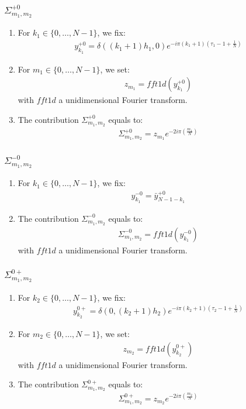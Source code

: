 \subsubsection{$\Sigma_{m_1,m_2}^{+0}$}
\begin{enumerate}
\item For $k_1\in\{0,\hdots,N-1\}$, we fix:
\begin{align*}
y^{+0}_{k_1}= \delta((k_1+1)h_1,0)e^{-i\pi (k_1+1)\left(\tau_1-1+\frac{1}{N}\right)}
\end{align*}
\item For $m_1\in\{0,\hdots,N-1\}$, we set:
\begin{align*}
  z_{m_1}=fft1d(y^{+0}_{k_1})
\end{align*}
with $fft1d$ a unidimensional Fourier transform.
\item The contribution $\Sigma_{m_1,m_2}^{+0}$ equals to:
\begin{align*}
  \Sigma_{m_1,m_2}^{+0}=z_{m_1} e^{-2i\pi\left(\frac{m_1}{N}\right)}
\end{align*}
\end{enumerate}

\subsubsection{$\Sigma_{m_1,m_2}^{-0}$}
\begin{enumerate}
\item For $k_1\in\{0,\hdots,N-1\}$, we fix:
\begin{align*}
y^{-0}_{k_1}= \bar{y}^{+0}_{N-1-k_1}
\end{align*}
\item The contribution $\Sigma_{m_1,m_2}^{-0}$ equals to:
\begin{align*}
  \Sigma_{m_1,m_2}^{-0}=fft1d(y^{-0}_{k_1})
\end{align*}
with $fft1d$ a unidimensional Fourier transform.
\end{enumerate}

\subsubsection{$\Sigma_{m_1,m_2}^{0+}$}
\begin{enumerate}
\item For $k_2\in\{0,\hdots,N-1\}$, we fix:
\begin{align*}
y^{0+}_{k_2}= \delta(0,(k_2+1)h_2)e^{-i\pi (k_2+1)\left(\tau_2-1+\frac{1}{N}\right)}
\end{align*}
\item For $m_2\in\{0,\hdots,N-1\}$, we set:
\begin{align*}
  z_{m_2}=fft1d(y^{0+}_{k_2})
\end{align*}
with $fft1d$ a unidimensional Fourier transform.
\item The contribution $\Sigma_{m_1,m_2}^{0+}$ equals to:
\begin{align*}
  \Sigma_{m_1,m_2}^{0+}=z_{m_2}e^{-2i\pi\left(\frac{m_2}{N}\right)}
\end{align*}
\end{enumerate}

